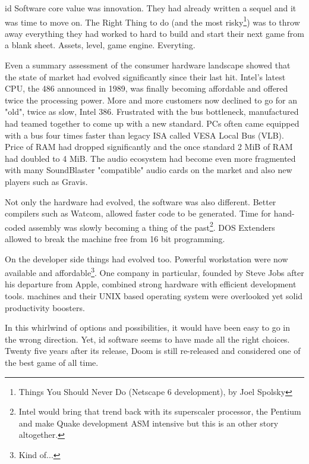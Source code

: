 id Software core value was innovation. They had already written a sequel and it was time to move on. The Right Thing to do (and the most risky\footnote{Things You Should Never Do (Netscape 6 development), by Joel Spolsky}) was to throw away everything they had worked to hard to build and start their next game from a blank sheet. Assets, level, game engine. Everyting.\\
\par
Even a summary assessment of the consumer hardware landscape showed that the state of market had evolved significantly since their last hit. Intel's latest CPU, the 486 announced in 1989, was finally becoming affordable and offered twice the processing power. More and more customers now declined to go for an "old", twice as slow, Intel 386. Frustrated with the bus bottleneck, manufactured had teamed together to come up with a new standard. PCs often came equipped with a bus four times faster than legacy ISA called VESA Local Bus (VLB). Price of RAM had dropped significantly and the once standard 2 MiB of RAM had doubled to 4 MiB. The audio ecosystem had become even more fragmented with many SoundBlaster "compatible" audio cards on the market and also new players such as Gravis.\\
 \par 
 Not only the hardware had evolved, the software was also different. Better compilers such as Watcom, allowed faster code to be generated. Time for hand-coded assembly was slowly becoming a thing of the past\footnote{Intel would bring that trend back with its superscaler processor, the Pentium and make Quake development ASM intensive but this is an other story altogether.}. DOS Extenders allowed to break the machine free from 16 bit programming.\\
 \par
 On the developer side things had evolved too. Powerful workstation were now available and affordable\footnote{Kind of...}. One company in particular, founded by Steve Jobs after his departure from Apple, combined strong hardware with efficient development tools. \NeXT machines and their UNIX based operating system were overlooked yet solid productivity boosters.\\
 \par
 In this whirlwind of options and possibilities, it would have been easy to go in the wrong direction. Yet, id software seems to have made all the right choices. Twenty five years after its release, Doom is still re-released and considered one of the best game of all time.\\
